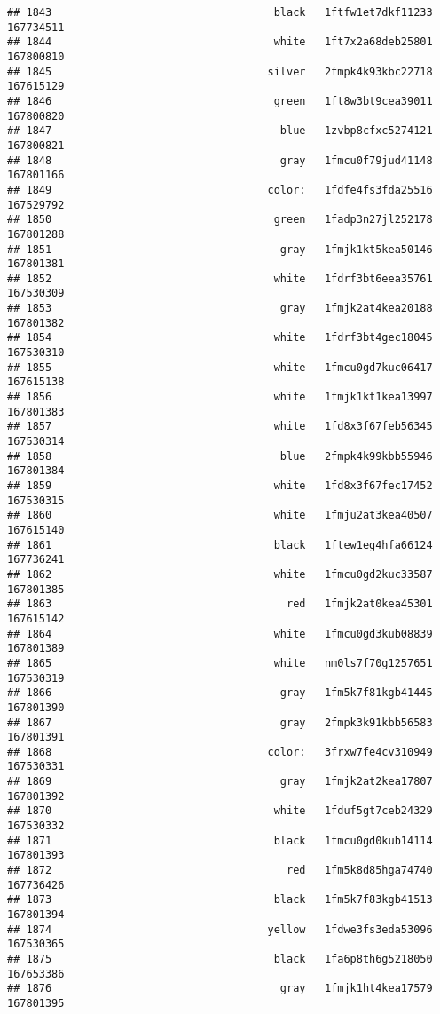 \documentclass[
]{article}
\begin{document}
\begin{verbatim}
## 1843                                   black   1ftfw1et7dkf11233 167734511
## 1844                                   white   1ft7x2a68deb25801 167800810
## 1845                                  silver   2fmpk4k93kbc22718 167615129
## 1846                                   green   1ft8w3bt9cea39011 167800820
## 1847                                    blue   1zvbp8cfxc5274121 167800821
## 1848                                    gray   1fmcu0f79jud41148 167801166
## 1849                                  color:   1fdfe4fs3fda25516 167529792
## 1850                                   green   1fadp3n27jl252178 167801288
## 1851                                    gray   1fmjk1kt5kea50146 167801381
## 1852                                   white   1fdrf3bt6eea35761 167530309
## 1853                                    gray   1fmjk2at4kea20188 167801382
## 1854                                   white   1fdrf3bt4gec18045 167530310
## 1855                                   white   1fmcu0gd7kuc06417 167615138
## 1856                                   white   1fmjk1kt1kea13997 167801383
## 1857                                   white   1fd8x3f67feb56345 167530314
## 1858                                    blue   2fmpk4k99kbb55946 167801384
## 1859                                   white   1fd8x3f67fec17452 167530315
## 1860                                   white   1fmju2at3kea40507 167615140
## 1861                                   black   1ftew1eg4hfa66124 167736241
## 1862                                   white   1fmcu0gd2kuc33587 167801385
## 1863                                     red   1fmjk2at0kea45301 167615142
## 1864                                   white   1fmcu0gd3kub08839 167801389
## 1865                                   white   nm0ls7f70g1257651 167530319
## 1866                                    gray   1fm5k7f81kgb41445 167801390
## 1867                                    gray   2fmpk3k91kbb56583 167801391
## 1868                                  color:   3frxw7fe4cv310949 167530331
## 1869                                    gray   1fmjk2at2kea17807 167801392
## 1870                                   white   1fduf5gt7ceb24329 167530332
## 1871                                   black   1fmcu0gd0kub14114 167801393
## 1872                                     red   1fm5k8d85hga74740 167736426
## 1873                                   black   1fm5k7f83kgb41513 167801394
## 1874                                  yellow   1fdwe3fs3eda53096 167530365
## 1875                                   black   1fa6p8th6g5218050 167653386
## 1876                                    gray   1fmjk1ht4kea17579 167801395

\end{verbatim}
\end{document}
